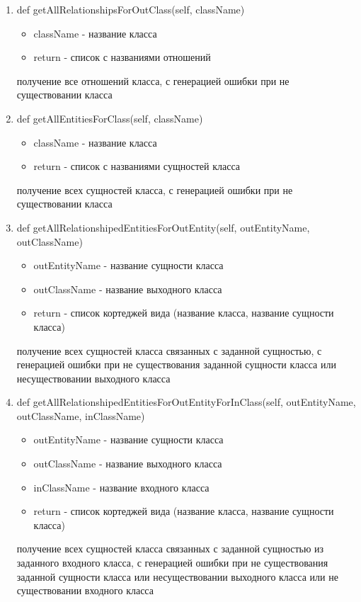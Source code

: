 \documentclass{article}
\begin{document}
\begin{enumerate}
	\item def getAllRelationshipsForOutClass(self, className)
	\begin{itemize}
		\item className - название класса
		\item return - список с названиями отношений
	\end{itemize}
	получение все отношений класса, с генерацией ошибки при не существовании класса
	
	\item def getAllEntitiesForClass(self, className)
	\begin{itemize}
		\item className - название класса
		\item return - список с названиями сущностей класса
	\end{itemize}
	получение всех сущностей класса, с генерацией ошибки при не существовании класса
	
	\item def getAllRelationshipedEntitiesForOutEntity(self, outEntityName, outClassName)
	\begin{itemize}
		\item outEntityName - название сущности класса
		\item outClassName - название выходного класса
		\item return - список кортеджей вида (название класса, название сущности класса)
	\end{itemize}
	получение всех сущностей класса связанных с заданной сущностью, с генерацией ошибки при не существования заданной сущности класса или несуществовании выходного класса
	
	\item def getAllRelationshipedEntitiesForOutEntityForInClass(self, outEntityName, outClassName, inClassName)
	\begin{itemize}
		\item outEntityName - название сущности класса
		\item outClassName - название выходного класса
		\item inClassName - название входного класса
		\item return - список кортеджей вида (название класса, название сущности класса)
	\end{itemize}
	получение всех сущностей класса связанных с заданной сущностью из заданного входного класса, с генерацией ошибки при не существования заданной сущности класса или несуществовании выходного класса или не существовании входного класса
	

\end{enumerate}
\end{document}
